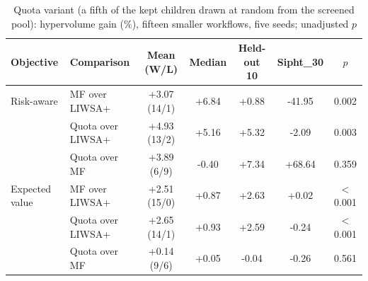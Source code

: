 \begin{table}[h]
    \caption{Quota variant (a fifth of the kept children drawn at random from the screened pool): hypervolume gain (\%), fifteen smaller workflows, five seeds; unadjusted $p$}
    \label{tab:quota}
    \centering\scriptsize
    \setlength{\tabcolsep}{2.5pt}
    \begin{tabular}{@{}llccccc@{}}
    \toprule
    Objective & Comparison & Mean (W/L) & Median & Held-out 10 & Sipht\_30 & $p$ \\
    \midrule
    Risk-aware & MF over LIWSA+ & +3.07 (14/1) & +6.84 & +0.88 & -41.95 & 0.002 \\
 & Quota over LIWSA+ & +4.93 (13/2) & +5.16 & +5.32 & -2.09 & 0.003 \\
 & Quota over MF & +3.89 (6/9) & -0.40 & +7.34 & +68.64 & 0.359 \\
\addlinespace
Expected value & MF over LIWSA+ & +2.51 (15/0) & +0.87 & +2.63 & +0.02 & $<$0.001 \\
 & Quota over LIWSA+ & +2.65 (14/1) & +0.93 & +2.59 & -0.24 & $<$0.001 \\
 & Quota over MF & +0.14 (9/6) & +0.05 & -0.04 & -0.26 & 0.561 \\
    \bottomrule
    \end{tabular}
    \end{table}
    